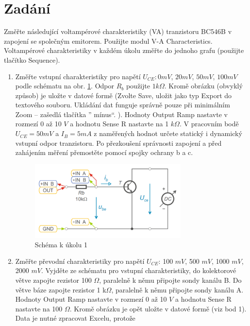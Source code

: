 \documentclass[a4paper]{article}
\begin{document}



\section*{Zadání}
Změřte následující voltampérové charakteristiky (VA) tranzistoru BC546B v zapojení se společným
emitorem. Použijte modul V-A Characteristics. Voltampérové charakteristiky v každém úkolu změřte
do jednoho grafu (použijte tlačítko Sequence).
\begin{enumerate}
	\item Změřte vstupní charakteristiky pro napětí $U_{CE}: 0 mV$, $20 mV$, $50 mV$, $100 mV$ podle schématu
	na obr. \ref{fig:mesh1}. Odpor $R_b$ použijte $1 k\Omega$. Kromě obrázku (obvyklý způsob) je uložte v datové formě
	(Zvolte Save, uložit jako typ Export do textového souboru. Ukládání dat funguje správně pouze
	při minimálním Zoom – zašedlá tlačítka ”
	mínus“. ).
	Hodnoty Output Ramp nastavte v rozmezí 0 až 10 $V$ a hodnotu Sense R nastavte na 1 $k\Omega$.
	V pracovním bodě $U_{CE} = 50 mV$ a $I_B = 5 mA$ z naměřených hodnot určete statický i dynamický
	vstupní odpor tranzistoru.
	Po přezkoušení správnosti zapojení a před zahájením měření přemostěte pomocí spojky ochrany
	b a c.
	\begin{figure}[H]
		\centering
		\includegraphics[width=0.75\textwidth]{schema1.png}
		\caption{Schéma k úkolu 1}
		\label{fig:mesh1}
	\end{figure}
	\item Změřte převodní charakteristiky pro napětí $U_{CE}$: 100 $mV$, 500 $mV$, 1000 $mV$, 2000 $mV$.
	Vyjděte ze schématu pro vstupní charakteristiky, do kolektorové větve zapojte rezistor 100 $\Omega$,
	paralelně k němu připojte sondy kanálu B. Do větve báze zapojte rezistor 1 k$\Omega$, paralelně k němu
	připojte sondy kanálu A.
	Hodnoty Output Ramp nastavte v rozmezí 0 až 10 $V$ a hodnotu Sense R nastavte na 100 $\Omega$.
	Kromě obrázku je opět uložte v datové formě (viz bod 1). Data je nutné zpracovat Excelu, protože

\end{enumerate}
\end{document}
